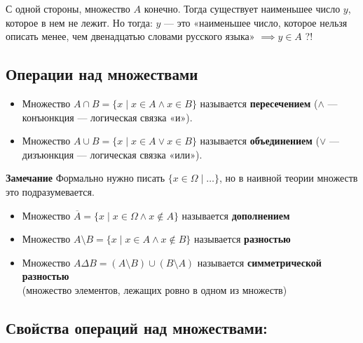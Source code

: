 \documentclass[10pt, a4paper]{article}
\begin{document}
\vspace{0.2cm}
\noindent С одной стороны, множество $A$ конечно. Тогда существует наименьшее число $y$, которое в нем не лежит. Но тогда: $y$ --- это «наименьшее число, которое нельзя описать менее, чем двенадцатью словами русского языка» $\implies y \in A$ \quad ?!

\vspace{0.3cm}
\subsection*{Операции над множествами}

\begin{itemize}
    \item Множество $A \cap B = \{ x \mid x \in A \land x \in B \}$ называется \textbf{пересечением} ($\land$ --- конъюнкция --- логическая связка «и»).
    \item Множество $A \cup B = \{ x \mid x \in A \lor x \in B \}$ называется \textbf{объединением} ($\lor$ --- дизъюнкция --- логическая связка «или»).
\end{itemize}

\vspace{0.2cm}
\noindent \textbf{Замечание} Формально нужно писать $\{ x \in \Omega \mid \dots \}$, но в наивной теории множеств это подразумевается.

\begin{itemize}
    \item Множество $\overline{A} = \{ x\mid  x \in \Omega \land x \notin A \}$ называется \textbf{дополнением}
    \item Множество $A \setminus B = \{ x \mid x \in A \land x \notin B \}$ называется \textbf{разностью}
    \item Множество $A \Delta B = (A \setminus B) \cup (B \setminus A)$ называется \textbf{симметрической разностью} \\
    \small (множество элементов, лежащих ровно в одном из множеств)
\end{itemize}

\vspace{0.2cm}
\subsection*{Свойства операций над множествами:}
\end{document}
